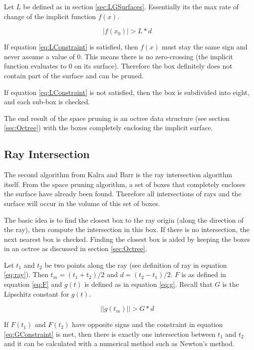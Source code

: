 \documentclass[conference]{acmsiggraph}
\begin{document}
Let $L$ be defined as in section \ref{sec:LGSurfaces}.  Essentially its
the max rate of change of the implicit function $f(x)$.  

\begin{equation}
\label{eq:LConstraint}
|f(x_0)| > L * d
\end{equation}

If equation \ref{eq:LConstraint} is satisfied, then $f(x)$ must stay 
the same sign and never assume a value of 0.  
This means there is no zero-crossing (the implicit function
evaluates to 0 on its surface).  Therefore the box definitely does not
contain part of the surface and can be pruned.  

If equation \ref{eq:LConstraint} is not satisfied, then the box is 
subdivided into eight, and each sub-box is checked.

The end result of the space pruning is an octree data structure 
(see section \ref{sec:Octree}) with the boxes completely enclosing the
implicit surface.

\subsection{Ray Intersection}
\label{sec:RayIntersection}

The second algorithm from Kalra and Barr is the ray intersection algorithm 
itself.  From the space pruning algorithm, a set of boxes that completely 
encloses the surface have already been found.  Therefore all intersections
of rays and the surface will occur in the volume of this set of boxes.

The basic idea is to find the closest box to the ray origin (along the 
direction of the ray), then compute the intersection in this box.  If 
there is no intersection, the next nearest box is checked.  Finding 
the closest box is aided by keeping the boxes in an octree as
discussed in section \ref{sec:Octree}.

Let $t_1$ and $t_2$ be two points along the ray (see definition of ray
in equation \ref{eq:ray}).  Then $t_m = (t_1 + t_2) / 2$ and 
$d = (t_2 - t_1) / 2$.  
$F$ is as defined in equation \ref{eq:F} and $g(t)$ is defined as in 
equation \ref{eq:g}.  Recall that $G$ is the Lipschitz constant for $g(t)$.

\begin{equation}
\label{eq:GConstraint}
||g(t_m)|| > G * d
\end{equation}

If $F(t_1)$ and $F(t_2)$ have opposite signs and the constraint in 
equation \ref{eq:GConstraint} is met, then there is exactly one 
intersection between $t_1$ and $t_2$ and it can be calculated with
a numerical method such as Newton's method.
\end{document}
